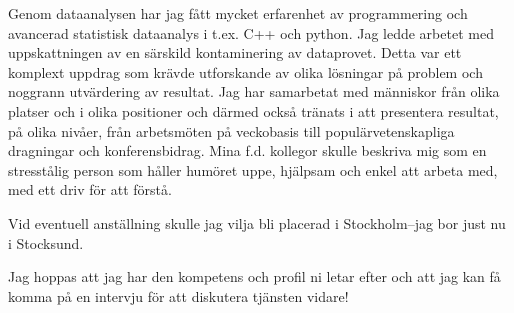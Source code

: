 \documentclass[11pt, a4paper]{../awesome-cv} %
\begin{document}
\begin{cvletter}
Genom dataanalysen har jag fått mycket erfarenhet av programmering och avancerad statistisk dataanalys i t.ex. C++ och python. 
Jag ledde arbetet med uppskattningen av en särskild kontaminering av dataprovet. %
Detta var ett komplext uppdrag som krävde utforskande av olika lösningar på problem och noggrann utvärdering av resultat.
Jag har samarbetat med människor från olika platser och i olika positioner och därmed också tränats i att presentera resultat, på olika nivåer, från arbetsmöten på veckobasis till populärvetenskapliga dragningar och konferensbidrag.
Mina f.d. kollegor skulle beskriva mig som en stresstålig person som håller humöret uppe, hjälpsam och enkel att arbeta med, med ett driv för att förstå. 

Vid eventuell anställning skulle jag vilja bli placerad i Stockholm–jag bor just nu i Stocksund. %

Jag hoppas att jag har den kompetens och profil ni letar efter och att jag kan få komma på en intervju för att diskutera tjänsten vidare!


\end{cvletter}


\makeletterclosing %
\end{document}
